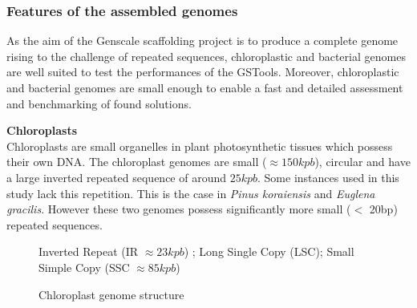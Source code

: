 \documentclass[12pt]{article}
\begin{document}
\subsubsection{Features of the assembled genomes}
\label{sec:genomefeatures}
As the aim of the Genscale scaffolding project is to produce a complete genome rising to the challenge of repeated sequences, chloroplastic and bacterial genomes are well suited to test the performances of the GSTools. Moreover, chloroplastic and bacterial genomes are small enough to enable a fast and detailed assessment and benchmarking of found solutions.

\textbf{Chloroplasts} \\
Chloroplasts are small organelles in plant photosynthetic tissues which possess their own DNA. The chloroplast genomes are small ($\approx 150kpb$), circular and have a large inverted repeated sequence of around $25kpb$. Some instances used in this study lack this repetition. This is the case in \textit{Pinus koraiensis} and \textit{Euglena gracilis}. However these two genomes possess significantly more small ($<$ 20bp) repeated sequences. 
\begin{figure}[h!]
\centering
{}
\caption{Chloroplast genome structure}
{\footnotesize Inverted Repeat (IR $ \approx 23kpb$) ; Long Single Copy (LSC); Small Simple Copy (SSC $\approx 85kpb$)}
\label{fig:chlostructure}
\end{figure} \\
\end{document}
